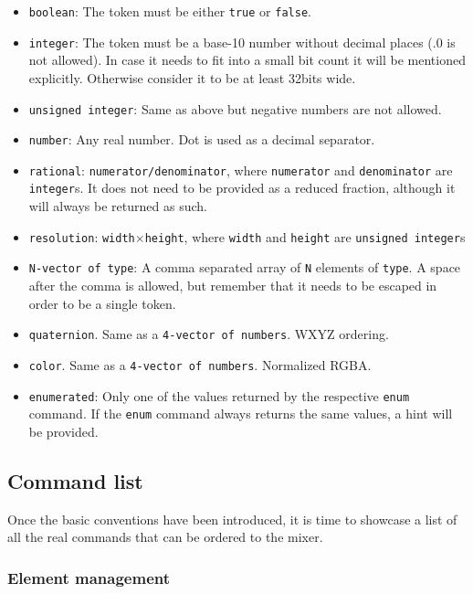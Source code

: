 \documentclass[../main.tex]{subfiles}
\begin{document}
\begin{itemize}
    \item \texttt{boolean}: The token must be either \texttt{true} or \texttt{false}.
    \item \texttt{integer}: The token must be a base-10 number without decimal places (.0 is not allowed). In case it needs to fit into a small bit count it will be mentioned explicitly. Otherwise consider it to be at least 32bits wide.
    \item \texttt{unsigned integer}: Same as above but negative numbers are not allowed.
    \item \texttt{number}: Any real number. Dot is used as a decimal separator.
    \item \texttt{rational}: \texttt{numerator/denominator}, where \texttt{numerator} and \texttt{denominator} are \texttt{integer}s. It does not need to be provided as a reduced fraction, although it will always be returned as such.
    \item \texttt{resolution}: \texttt{width$\times$height}, where \texttt{width} and \texttt{height} are \texttt{unsigned integer}s
    \item \texttt{N-vector of type}: A comma separated array of \texttt{N} elements of \texttt{type}. A space after the comma is allowed, but remember that it needs to be escaped in order to be a single token.
    \item \texttt{quaternion}. Same as a \texttt{4-vector of numbers}. WXYZ ordering.
    \item \texttt{color}. Same as a \texttt{4-vector of numbers}. Normalized RGBA.
    \item \texttt{enumerated}: Only one of the values returned by the respective \texttt{enum} command. If the \texttt{enum} command always returns the same values, a hint will be provided.
    
\end{itemize}


\subsection{Command list}

Once the basic conventions have been introduced, it is time to showcase a list of all the real commands that can be ordered to the mixer.\newline

\subsubsection{Element management}
\end{document}
